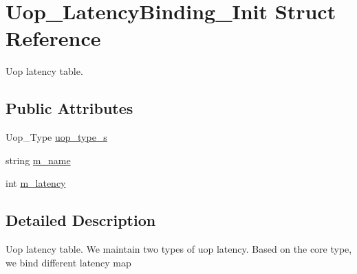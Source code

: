 \hypertarget{structUop__LatencyBinding__Init}{
\section{Uop\_\-LatencyBinding\_\-Init Struct Reference}
\label{structUop__LatencyBinding__Init}
}


Uop latency table.  


\subsection*{Public Attributes}
\begin{DoxyCompactItemize}
\item 
Uop\_\-Type \hyperlink{structUop__LatencyBinding__Init_a489ee0c815812d2fa7df97788ce8838d}{uop\_\-type\_\-s}
\item 
string \hyperlink{structUop__LatencyBinding__Init_a629733a1a1bbaf31462e071124f528f7}{m\_\-name}
\item 
int \hyperlink{structUop__LatencyBinding__Init_a20fe2b910b4498004be1d25050470d79}{m\_\-latency}
\end{DoxyCompactItemize}


\subsection{Detailed Description}
Uop latency table. We maintain two types of uop latency. Based on the core type, we bind different latency map 

